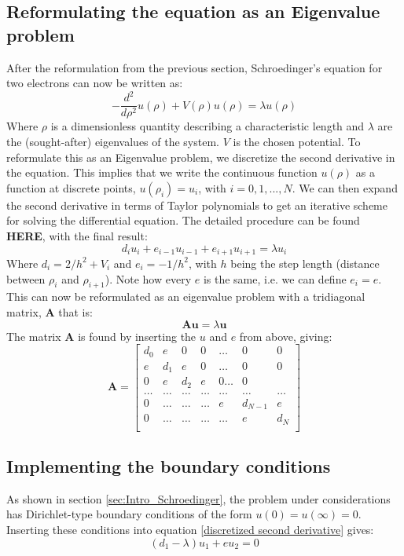 \documentclass[a4paper, 10pt]{article}
\begin{document}
\subsection{Reformulating the equation as an Eigenvalue problem}
After the reformulation from the previous section, Schroedinger's equation for two electrons can now be written as:
\begin{equation}
-\frac{d^2}{d\rho^2}u(\rho)+V(\rho)u(\rho)=\lambda u(\rho)
\end{equation}
Where $\rho$ is a dimensionless quantity describing a characteristic length and $\lambda$ are the (sought-after) eigenvalues of the system. $V$ is the chosen potential. To reformulate this as an Eigenvalue problem, we discretize the second derivative in the equation. This implies that we write the continuous function $u(\rho)$ as a function at discrete points, $u(\rho_i)=u_i$, with $i=0,1,...,N$. We can then expand the second derivative in terms of Taylor polynomials to get an iterative scheme for solving the differential equation. The detailed procedure can be found \textbf{HERE}, with the final result:
\begin{equation}\label{discretized second derivative}
d_iu_i+e_{i-1}u_{i-1}+e_{i+1}u_{i+1}=\lambda u_i
\end{equation}
Where  $d_i=2/h^2+V_i$ and $e_i=-1/h^2$, with $h$ being the step length (distance between $\rho_i$ and $\rho_{i+1}$). Note how every $e$ is the same, i.e. we can define $e_i=e$. This can now be reformulated as an eigenvalue problem with a tridiagonal matrix, $\mathbf{A}$ that is:
\begin{equation}\label{eq:Eigenvalue_problem}
\mathbf{A}\mathbf{u}=\lambda \mathbf{u}
\end{equation}
The matrix $\mathbf{A}$ is found by inserting the $u$ and $e$ from above, giving:
$$\mathbf{A}=\begin{bmatrix}
d_0 & e & 0 & 0 & \dots & 0 & 0\\
e & d_1 & e & 0 & \dots & 0 & 0\\
0 & e & d_2 & e & 0 \dots & 0\\
\dots & \dots & \dots & \dots & \dots& \dots & \dots \\
0 & \dots & \dots &\dots & e & d_{N-1} & e\\
0 & \dots & \dots & \dots & \dots & e & d_N\\
\end{bmatrix}$$
\subsection{Implementing the boundary conditions}
As shown in section \ref{sec:Intro_Schroedinger}, the problem under considerations has Dirichlet-type boundary conditions of the form $u(0)=u(\infty)=0$. Inserting these conditions into equation \ref{discretized second derivative} gives:
$$(d_1-\lambda)u_1+eu_{2}=0$$
\end{document}
